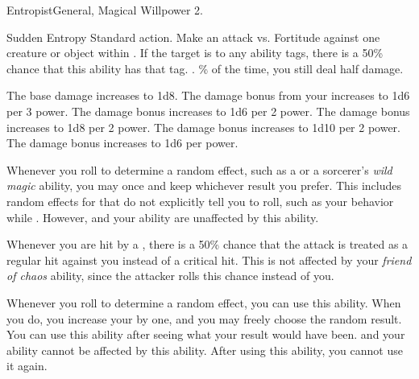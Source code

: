   \begin{magicalfeat}{Entropist}{General, Magical}
    \featpre Willpower 2.

    \begin{magicalactiveability}{Sudden Entropy}
      \abilityusagetime Standard action.
      \rankline
      Make an attack vs. Fortitude against one creature or object within \shortrange.
      If the target is \vulnerable to any ability tags, there is a 50\% chance that this ability has that tag.
      \hit \damageranktwo.
      \% of the time, you still deal half damage.

      \rankline
       The base damage increases to 1d8.
       The damage bonus from your  increases to 1d6 per 3 power.
       The damage bonus increases to 1d6 per 2 power.
       The damage bonus increases to 1d8 per 2 power.
       The damage bonus increases to 1d10 per 2 power.
       The damage bonus increases to 1d6 per power.
    \end{magicalactiveability}

     Whenever you roll to determine a random effect, such as a  or a sorcerer's \textit{wild magic} ability, you may  once and keep whichever result you prefer.
    This includes random effects for that do not explicitly tell you to roll, such as your behavior while \confused.
    However,  and your  ability are unaffected by this ability.

     Whenever you are hit by a , there is a 50\% chance that the attack is treated as a regular hit against you instead of a critical hit.
    This is not affected by your \textit{friend of chaos} ability, since the attacker rolls this chance instead of you.

     Whenever you roll to determine a random effect, you can use this ability.
    When you do, you increase your  by one, and you may freely choose the random result.
    You can use this ability after seeing what your result would have been.
     and your  ability cannot be affected by this ability.
    After using this ability, you  cannot use it again.
  \end{magicalfeat}

